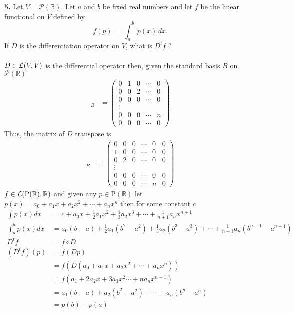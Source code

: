 \documentclass[11pt]{amsart}
\theoremstyle{definition}  %
\newcommand{\R}{\mathbb{R}}
\begin{document}
\newpage
\vskip 0.1cm
\noindent
{\bf 5.} Let $V =\mathcal{P}(\R)$. Let $a$ and $b$ be fixed real numbers and let $f$ be the linear functional on $V$ defined by
$$ f(p) \, = \, \int_a^b \, p(x) \, dx.$$
If $D$ is the differentiation operator on $V$, what is $D^t f$ ? \\
\\
$D \in \mathcal{L}(V,V)$ is the differential operator then, given the standard basis $B$ on $\mathcal{P}(\R)$
\begin{align*}
	[D]_B &= \left( \begin{array}{ccccc}
		0 & 1 & 0 & \cdots & 0 \\
		0 & 0 & 2 & \cdots & 0 \\
		0 & 0 & 0 & \cdots & 0 \\
		\vdots \\
		0 & 0 & 0 & \cdots & n \\
		0 & 0 & 0 & \cdots & 0 
	\end{array}
	\right)
\end{align*}Thus, the matrix of $D$ transpose is
\begin{align*}
	[D^t]_B &= \left( \begin{array}{cccccc}
		0 & 0 & 0 & \cdots & 0 &0 \\
		1 & 0 & 0 & \cdots & 0 &0 \\
		0 & 2 & 0 & \cdots & 0 &0 \\
		\vdots \\
		0 & 0 & 0 & \cdots & 0&0 \\
		0 & 0 & 0 & \cdots & n &0 
	\end{array}
	\right)
\end{align*}$f \in \LL(\mathrm{P}(\R),\R)$ and given any $p\in \mathrm{P}(\R)$ let $p(x) = a_0+a_1x+a_2x^2+\cdots+a_nx^n$ then for some constant $c$
\begin{align*}
	\int p(x) dx &= c+a_0x+\frac{1}{2}a_1x^2+\frac{1}{3}a_2x^3+\cdots+\frac{1}{n+1}a_nx^{n+1} \\
	\int_a^b p(x) dx &= a_0(b-a)+\frac{1}{2}a_1(b^2-a^2)+\frac{1}{3}a_2(b^3-a^3)+\cdots+\frac{1}{n+1}a_n(b^{n+1}-a^{n+1}) \\
	D^t f &= f \circ D \\
	(D^t f)(p) &=  f(Dp) \\
	&= f(D(a_0+a_1x+a_2x^2+\cdots+a_nx^n)) \\
	&= f(a_1+2a_2x+3a_3x^2\cdots+na_nx^{n-1}) \\
	&= a_1(b-a)+a_2(b^2-a^2) + \cdots + a_n(b^n-a^n) \\
	&= p(b)-p(a)
\end{align*}
\\
\end{document}
